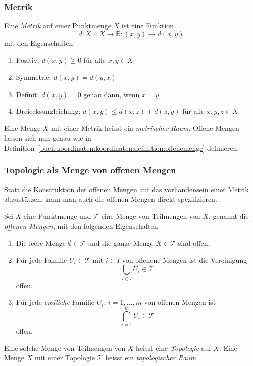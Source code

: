 %
%
\subsubsection{Metrik}
Eine {\em Metrik} auf einer Punktmenge  $X$
ist eine Funktion
\[
d
\colon
X\times X \to \mathbb{R}
:
(x,y)\mapsto d(x,y)
\]
mit den Eigenschaften
\begin{enumerate}
\item Positiv: $d(x,y)\ge 0$ für alle $x,y\in X$.
\item Symmetrie: $d(x,y)=d(y,x)$
\item Definit: $d(x,y)=0$ genau dann, wenn $x=y$.
\item Dreiecksungleichung: $d(x,y) \le d(x,z)+d(z,y)$ für alle
$x,y,z\in X$.
\end{enumerate}
Eine Menge $X$ mit einer Metrik heisst ein {\em metrischer Raum}.
%
Offene Mengen lassen sich nun genau wie in
Definition~\ref{buch:koordinaten:koordinaten:definition:offenemenge}
definieren.

%
%
\subsubsection{Topologie als Menge von offenen Mengen}
Statt die Konstruktion der offenen Mengen auf das vorhandensein einer
Metrik abzustützen, kann man auch die offenen Mengen direkt spezifizieren.

\begin{definition}[Topologie]
\label{buch:koordinaten:koordinaten:definition:topologie}
Sei $X$ eine Punktmenge und $\mathscr{T}$ eine Menge von Teilmengen
von $X$, genannt die {\em offenen Mengen}, mit den folgenden Eigenschaften:
%
\begin{enumerate}
\item Die leere Menge $\emptyset \in \mathscr{T}$ und die ganze Menge
$X\in \mathscr{T}$ sind offen.
\item Für jede Familie $U_i\in \mathscr{T}$ mit $i\in I$ von offenene
Mengen ist die Vereinigung
\[
\bigcup_{i\in I}U_i \in\mathscr{T}
\]
offen.
\item Für jede {\em endliche} Familie $U_i$, $i=1,\dots,m$ von offenen
Mengen ist
\[
\bigcap_{i=1}^m U_i \in\mathscr{T}
\]
offen.
\end{enumerate}
Eine solche Menge von Teilmengen von $X$ heisst eine {\em Topologie}
%
auf $X$.
Eine Menge $X$ mit einer Topologie $\mathscr{T}$ heisst ein
{\em topologischer Raum}.
%
\end{definition}

